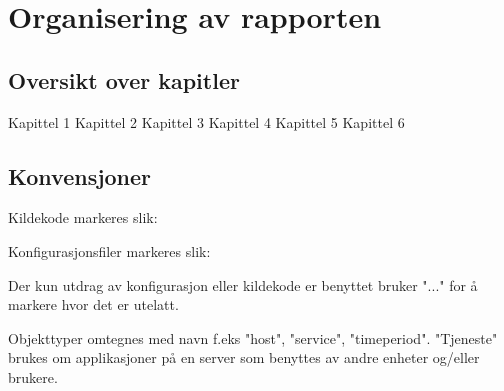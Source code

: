 \section{Organisering av rapporten}
\subsection{Oversikt over kapitler}
Kapittel 1
Kapittel 2
Kapittel 3
Kapittel 4
Kapittel 5
Kapittel 6
\subsection{Konvensjoner}
Kildekode markeres slik:

Konfigurasjonsfiler markeres slik:

Der kun utdrag av konfigurasjon eller kildekode er benyttet bruker "..." for å markere hvor det er utelatt.

Objekttyper omtegnes med navn f.eks "host", "service", "timeperiod". "Tjeneste" brukes om applikasjoner på en server som benyttes av andre enheter og/eller brukere. 
